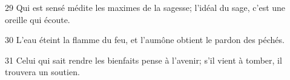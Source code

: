 
29 Qui est sensé médite les maximes de la sagesse; l’idéal du sage, c’est une oreille qui écoute.

30 L’eau éteint la flamme du feu, et l’aumône obtient le pardon des péchés.

31 Celui qui sait rendre les bienfaits pense à l’avenir; s’il vient à tomber, il trouvera un soutien.